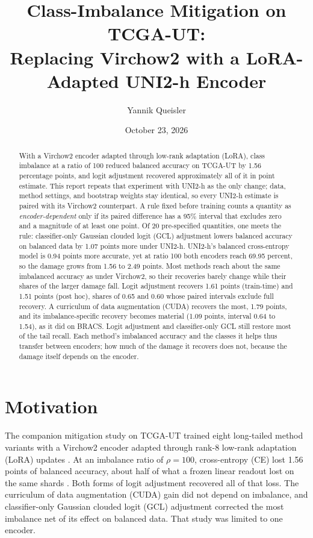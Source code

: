 \documentclass[11pt]{article}
\title{Class-Imbalance Mitigation on TCGA-UT:\\Replacing Virchow2 with a LoRA-Adapted {UNI2-h} Encoder}
\author{Yannik Queisler}
\date{October 23, 2026}
\begin{document}
\raggedbottom
{}
\setlength{\emergencystretch}{2em}
\maketitle
\begin{abstract}
\noindent With a Virchow2 encoder adapted through low-rank adaptation (LoRA), class imbalance at a ratio of 100 reduced balanced accuracy on TCGA-UT by 1.56 percentage points, and logit adjustment recovered approximately all of it in point estimate. This report repeats that experiment with UNI2-h as the only change; data, method settings, and bootstrap weights stay identical, so every UNI2-h estimate is paired with its Virchow2 counterpart. A rule fixed before training counts a quantity as \emph{encoder-dependent} only if its paired difference has a 95\% interval that excludes zero and a magnitude of at least one point. Of 20 pre-specified quantities, one meets the rule: classifier-only Gaussian clouded logit (GCL) adjustment lowers balanced accuracy on balanced data by 1.07 points more under UNI2-h. UNI2-h's balanced cross-entropy model is 0.94 points more accurate, yet at ratio 100 both encoders reach 69.95 percent, so the damage grows from 1.56 to 2.49 points. Most methods reach about the same imbalanced accuracy as under Virchow2, so their recoveries barely change while their shares of the larger damage fall. Logit adjustment recovers 1.61 points (train-time) and 1.51 points (post hoc), shares of 0.65 and 0.60 whose paired intervals exclude full recovery. A curriculum of data augmentation (CUDA) recovers the most, 1.79 points, and its imbalance-specific recovery becomes material (1.09 points, interval 0.64 to 1.54), as it did on BRACS. Logit adjustment and classifier-only GCL still restore most of the tail recall. Each method's imbalanced accuracy and the classes it helps thus transfer between encoders; how much of the damage it recovers does not, because the damage itself depends on the encoder.
\end{abstract}

\section{Motivation}
\label{sec:motivation}
The companion mitigation study on TCGA-UT trained eight long-tailed method variants with a Virchow2 encoder \citep{zimmermann2024virchow2} adapted through rank-8 low-rank adaptation (LoRA) updates \citep{queisler2026mitigationTcga,queisler2026mitigationMethods}. At an imbalance ratio of $\rho=100$, cross-entropy (CE) lost 1.56 points of balanced accuracy, about half of what a frozen linear readout lost on the same shards \citep{queisler2026prevalenceTcga}. Both forms of logit adjustment recovered all of that loss. The curriculum of data augmentation (CUDA) gain did not depend on imbalance, and classifier-only Gaussian clouded logit (GCL) adjustment corrected the most imbalance net of its effect on balanced data. That study was limited to one encoder.
\end{document}
